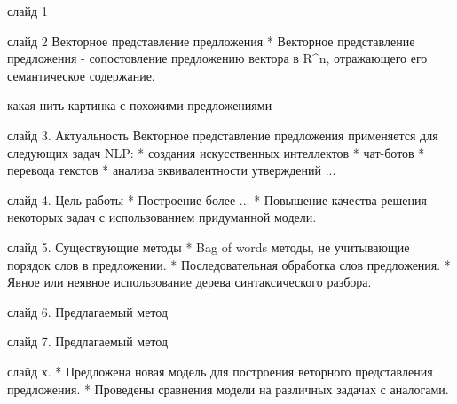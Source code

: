 слайд 1


слайд 2
Векторное представление предложения
* Векторное представление предложения - сопостовление предложению вектора в R^n, отражающего его семантическое содержание.

какая-нить картинка с похожими предложениями


слайд 3.
Актуальность
Векторное представление предложения применяется для следующих задач NLP:
* создания искусственных интеллектов
* чат-ботов
* перевода текстов
* анализа эквивалентности утверждений
...

слайд 4.
Цель работы
* Построение более ...
* Повышение качества решения некоторых задач с использованием придуманной модели.

слайд 5.
Существующие методы
* Bag of words методы, не учитывающие порядок слов в предложении.
* Последовательная обработка слов предложения.
* Явное или неявное использование дерева синтаксического разбора.


слайд 6.
Предлагаемый метод

слайд 7.
Предлагаемый метод


слайд х.
* Предложена новая модель для построения веторного представления предложения.
* Проведены сравнения модели на различных задачах с аналогами.
